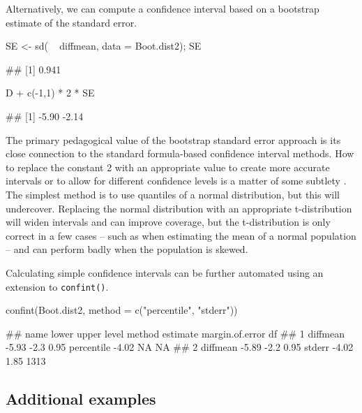 \noindent
Alternatively, we can compute a confidence interval based on a bootstrap
estimate of the standard error.

\begin{Schunk}
\begin{Sinput}
SE <- sd( ~ diffmean, data = Boot.dist2); SE
\end{Sinput}
\begin{Soutput}
## [1] 0.941
\end{Soutput}
\begin{Sinput}
D + c(-1,1) * 2 * SE
\end{Sinput}
\begin{Soutput}
## [1] -5.90 -2.14
\end{Soutput}
\end{Schunk}

\noindent
The primary pedagogical value of the bootstrap standard error approach
is its close connection to the standard formula-based confidence
interval methods. How to replace the constant 2 with an appropriate
value to create more accurate intervals or to allow for different
confidence levels is a matter of some subtlety \citep{Hesterberg:2015}.
The simplest method is to use quantiles of a normal distribution, but
this will undercover. Replacing the normal distribution with an
appropriate t-distribution will widen intervals and can improve
coverage, but the t-distribution is only correct in a few cases -- such
as when estimating the mean of a normal population -- and can perform
badly when the population is skewed.

Calculating simple confidence intervals can be further automated using
an extension to \texttt{confint()}.

\begin{Schunk}
\begin{Sinput}
confint(Boot.dist2, method = c("percentile", "stderr"))
\end{Sinput}
\begin{Soutput}
##       name lower upper level     method estimate margin.of.error   df
## 1 diffmean -5.93  -2.3  0.95 percentile    -4.02              NA   NA
## 2 diffmean -5.89  -2.2  0.95     stderr    -4.02            1.85 1313
\end{Soutput}
\end{Schunk}

\subsection{Additional examples}\label{additional-examples}


